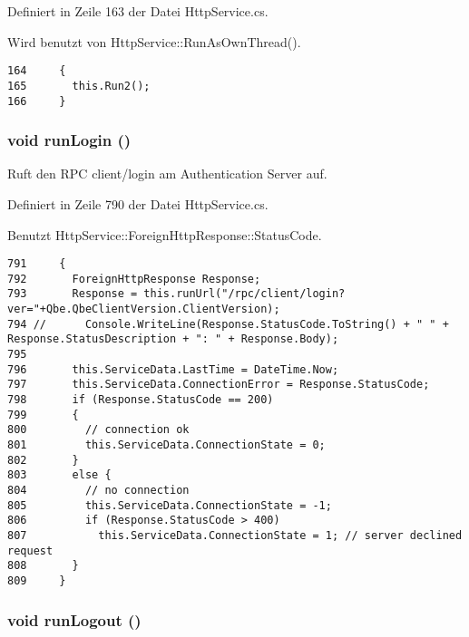 Definiert in Zeile 163 der Datei Http\-Service.cs.

Wird benutzt von Http\-Service::Run\-As\-Own\-Thread().



\footnotesize\begin{verbatim}164     {
165       this.Run2();
166     }
\end{verbatim}\normalsize 
\hypertarget{classQbeSAS_1_1HttpService_QbeSAS_1_1HttpServicea5}{
\subsubsection[runLogin]{\setlength{\rightskip}{0pt plus 5cm}void run\-Login ()}}
\label{classQbeSAS_1_1HttpService_QbeSAS_1_1HttpServicea5}


Ruft den RPC client/login am Authentication Server auf. 



Definiert in Zeile 790 der Datei Http\-Service.cs.

Benutzt Http\-Service::Foreign\-Http\-Response::Status\-Code.



\footnotesize\begin{verbatim}791     {
792       ForeignHttpResponse Response;
793       Response = this.runUrl("/rpc/client/login?ver="+Qbe.QbeClientVersion.ClientVersion);
794 //      Console.WriteLine(Response.StatusCode.ToString() + " " + Response.StatusDescription + ": " + Response.Body);
795 
796       this.ServiceData.LastTime = DateTime.Now;
797       this.ServiceData.ConnectionError = Response.StatusCode;
798       if (Response.StatusCode == 200) 
799       {
800         // connection ok
801         this.ServiceData.ConnectionState = 0; 
802       } 
803       else { 
804         // no connection
805         this.ServiceData.ConnectionState = -1; 
806         if (Response.StatusCode > 400)
807           this.ServiceData.ConnectionState = 1; // server declined request
808       }
809     }
\end{verbatim}\normalsize 
\hypertarget{classQbeSAS_1_1HttpService_QbeSAS_1_1HttpServicea4}{
\subsubsection[runLogout]{\setlength{\rightskip}{0pt plus 5cm}void run\-Logout ()}}
\label{classQbeSAS_1_1HttpService_QbeSAS_1_1HttpServicea4}


